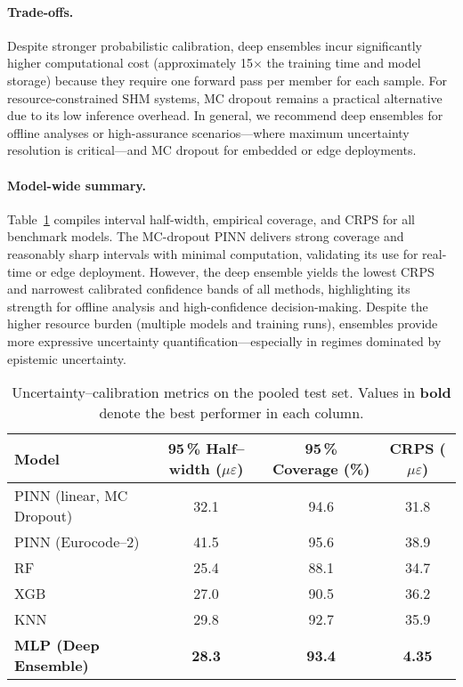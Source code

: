 \documentclass{article}
\renewcommand{\arraystretch}{1.15} %
\begin{document}
\paragraph{Trade-offs.} Despite stronger probabilistic calibration, deep ensembles incur significantly higher computational cost (approximately 15$\times$ the training time and model storage) because they require one forward pass per member for each sample. For resource-constrained SHM systems, MC dropout remains a practical alternative due to its low inference overhead. In general, we recommend deep ensembles for offline analyses or high-assurance scenarios—where maximum uncertainty resolution is critical—and MC dropout for embedded or edge deployments.

\paragraph{Model-wide summary.} Table~\ref{tab:uq_summary} compiles interval half-width, empirical coverage, and CRPS for all benchmark models. The MC-dropout PINN delivers strong coverage and reasonably sharp intervals with minimal computation, validating its use for real-time or edge deployment. However, the deep ensemble yields the lowest CRPS and narrowest calibrated confidence bands of all methods, highlighting its strength for offline analysis and high-confidence decision-making. Despite the higher resource burden (multiple models and training runs), ensembles provide more expressive uncertainty quantification—especially in regimes dominated by epistemic uncertainty.


\begin{table}[!htbp]
  \centering
  \caption{Uncertainty–calibration metrics on the pooled test set.
           Values in \textbf{bold} denote the best performer in each column.}
  \label{tab:uq_summary}
  \footnotesize
  \renewcommand{\arraystretch}{1.15}
  \begin{tabular}{lccc}
    \toprule
    Model & 95\,\% Half--width ($\mu\varepsilon$) &
            95\,\% Coverage (\%) & CRPS ($\mu\varepsilon$)\\
    \midrule
    PINN (linear, MC Dropout) & 32.1 & 94.6 & 31.8\\
    PINN (Eurocode--2)        & 41.5 & 95.6 & 38.9\\
    RF                        & 25.4 & 88.1 & 34.7\\
    XGB                       & 27.0 & 90.5 & 36.2\\
    KNN                       & 29.8 & 92.7 & 35.9\\
    \textbf{MLP (Deep Ensemble)} & \textbf{28.3} & \textbf{93.4} & \textbf{4.35} \\
    \bottomrule
  \end{tabular}
\end{table}
\end{document}
